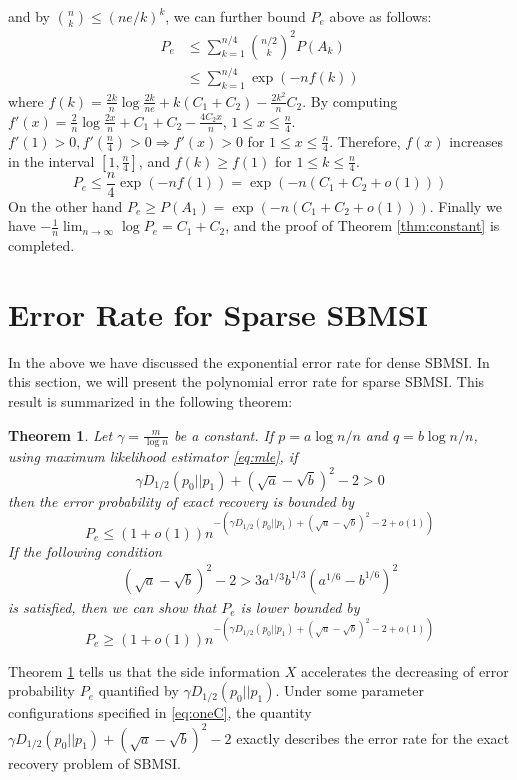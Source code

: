 \documentclass[conference,letterpaper]{IEEEtran}
\newtheorem{theorem}{Theorem}
\begin{document}
and by $\binom{n}{k} \leq (ne/k)^k$, we can further bound $P_e$ above as follows:
\begin{align*}
P_e & \leq \sum_{k=1}^{n/4} \binom{n/2}{k}^2 P(A_k) \\
& \leq \sum_{k=1}^{n/4} \exp(-nf(k))
\end{align*}
where
$f(k) = \frac{2k}{n}\log \frac{2k}{ne} + k(C_1+C_2) - \frac{2k^2}{n}C_2$.
By computing $f'(x)= \frac{2}{n} \log \frac{2x}{n} + C_1+C_2 - \frac{4C_2x}{n}$, $1\leq x \leq \frac{n}{4}$.
$f'(1) > 0 , f'(\frac{n}{4}) > 0 \Rightarrow f'(x) > 0$ for $1\leq x \leq \frac{n}{4}$.
Therefore, $f(x)$ increases in the interval $[1, \frac{n}{4}]$, and $f(k) \geq f(1)$ for $1\leq k \leq \frac{n}{4}$.
\begin{equation}
P_e \leq \frac{n}{4}\exp(-nf(1)) = \exp(-n (C_1+C_2+o(1)))
\end{equation}
On the other hand $P_e \geq P(A_1) = \exp(-n(C_1+C_2+o(1)))$.
Finally we have
$-\frac{1}{n} \lim_{n \to \infty} \log P_e = C_1+C_2$,
and the proof of Theorem \ref{thm:constant} is completed.

\section{Error Rate for Sparse SBMSI}\label{sec:ees}
In the above we have discussed the exponential error rate for dense SBMSI.
In this section, we will present the polynomial error rate for sparse SBMSI.
This result is summarized in the following theorem:
\begin{theorem}\label{thm:Pe}
Let $\gamma = \frac{ m}{\log n}$ be a constant. If $p = a \log n /n$ and $q = b \log n / n$, using maximum likelihood estimator \eqref{eq:mle},
if
\begin{equation}\label{eq:positive_condition}
\gamma D_{1/2}(p_0||p_1) + (\sqrt{a} - \sqrt{b})^2-2 > 0
\end{equation}
then the error probability
of exact recovery is bounded by
\begin{equation}\label{eq:PeMain}
P_e \leq (1+o(1)) n^{-\left(\gamma D_{1/2}(p_0||p_1) + (\sqrt{a} - \sqrt{b})^2-2 + o(1)\right) }
\end{equation}
If the following condition
\begin{align}
(\sqrt{a}-\sqrt{b})^2-2 
> 3a^{1/3}b^{1/3}(a^{1/6}-b^{1/6})^2\label{eq:oneC}
\end{align}
is satisfied, then we can show that $P_e$ is lower bounded by
\begin{equation}\label{eq:PeMainL}
P_e \geq (1+o(1)) n^{-\left(\gamma D_{1/2}(p_0||p_1) + (\sqrt{a} - \sqrt{b})^2-2 + o(1)\right)}
\end{equation}
\end{theorem}
Theorem \ref{thm:Pe} tells us that the side information $X$ accelerates the
decreasing of error probability $P_e$ quantified by $\gamma D_{1/2}(p_0||p_1)$.
Under some parameter configurations specified in \eqref{eq:oneC},
the quantity $\gamma D_{1/2}(p_0||p_1) + (\sqrt{a} - \sqrt{b})^2-2$
exactly describes the error rate for the exact recovery problem of SBMSI.
\end{document}
